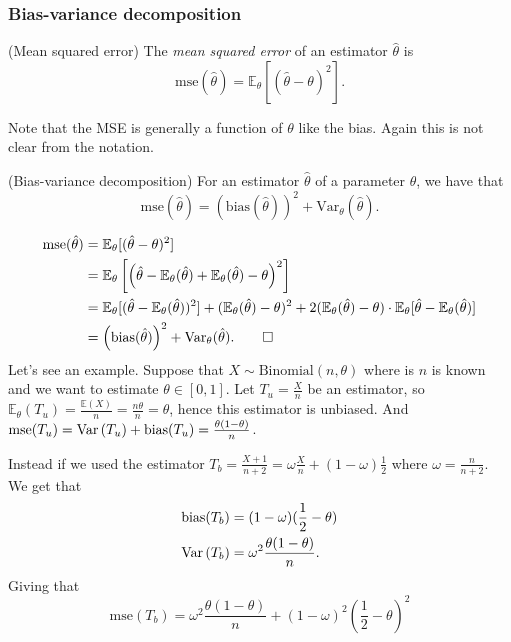 \documentclass{article}
\begin{document}
\subsubsection{Bias-variance decomposition}
\begin{definition}
	(Mean squared error) The \textit{mean squared error} of an estimator $ \hat\theta $ is
	\[
		\mathrm{mse}(\hat\theta) = \mathbb E_\theta[(\hat\theta-\theta)^2].
	\]
\end{definition}
\begin{remark}
  Note that the MSE is generally a function of $ \theta $ like the bias. Again this is not clear from the notation.
\end{remark}
\begin{proposition}
	(Bias-variance decomposition) For an estimator $ \hat\theta $ of a parameter $ \theta $, we have that
	\[
		\mathrm{mse}(\hat\theta)=\left(\mathrm{bias}(\hat\theta)\right)^2 + \mathrm{Var}_\theta(\hat\theta).
	\]
\end{proposition}
\pf 
\begin{align*}
	\mathrm{mse}(\hat\theta) &= \mathbb E_\theta[(\hat\theta-\theta)^2] \\
				 &= \mathbb E_\theta\left[\left(\hat\theta-\mathbb E_\theta(\hat\theta)+\mathbb E_\theta(\hat\theta)-\theta\right)^2\right]\\
				 &= \mathbb E_\theta[(\hat\theta -\mathbb E_\theta(\hat\theta))^2]+(\mathbb E_\theta(\hat\theta)-\theta)^2 + 2(\mathbb E_\theta(\hat\theta) - \theta) \cdot \mathbb E_\theta[\hat\theta - \mathbb E_\theta(\hat\theta)]\\
				 &= \left(\mathrm{bias}(\hat\theta)\right)^2 + \mathrm{Var}_\theta(\hat\theta).\qed
\end{align*}
Let's see an example. Suppose that $ X\sim \text{Binomial}(n,\theta) $ where is $ n $ is known and we want to estimate $ \theta\in[0,1] $. Let $ T_u=\frac{X}n $ be an estimator, so $ \mathbb E_\theta(T_u)=\frac{\mathbb E(X)}n = \frac{n\theta}n = \theta $, hence this estimator is unbiased. And $ \mathrm{mse}(T_u) = \operatorname{Var}\left({T_u}\right) +\mathrm{bias}(T_u) = \frac{\theta(1-\theta)}n $.\par
Instead if we used the estimator $ T_b = \frac{X+1}{n+2}  = \omega\frac Xn + (1-\omega)\frac 12 $ where $ \omega = \frac n{n+2} $. We get that
\begin{align*}
	\mathrm{bias}(T_b) &= (1-\omega)(\frac 12 - \theta)\\
	\operatorname{Var}\left({T_b}\right) &= \omega^2\frac{\theta(1-\theta)}n.
\end{align*}
Giving that
\[
	\mathrm {mse}(T_b) = \omega^2 \frac{\theta(1-\theta)}n + (1-\omega)^2(\frac 12 - \theta)^2
\]
\end{document}
